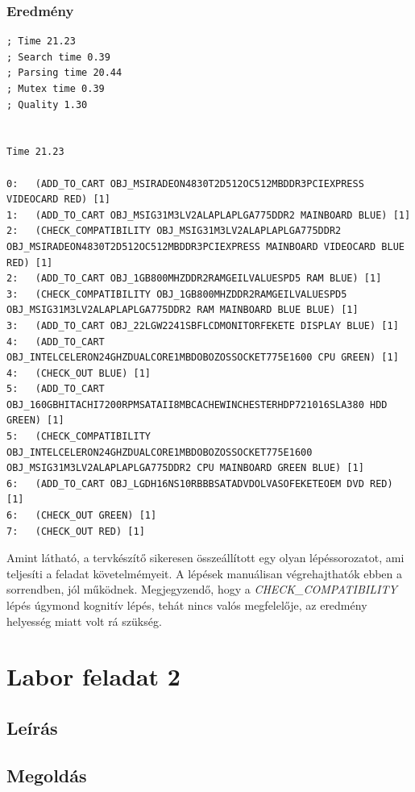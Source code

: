 \subsubsection{Eredmény}
\begin{lstlisting}[frame=single,float=!ht]	
; Time 21.23
; Search time 0.39
; Parsing time 20.44
; Mutex time 0.39
; Quality 1.30


Time 21.23

0:   (ADD_TO_CART OBJ_MSIRADEON4830T2D512OC512MBDDR3PCIEXPRESS VIDEOCARD RED) [1]
1:   (ADD_TO_CART OBJ_MSIG31M3LV2ALAPLAPLGA775DDR2 MAINBOARD BLUE) [1]
2:   (CHECK_COMPATIBILITY OBJ_MSIG31M3LV2ALAPLAPLGA775DDR2 OBJ_MSIRADEON4830T2D512OC512MBDDR3PCIEXPRESS MAINBOARD VIDEOCARD BLUE RED) [1]
2:   (ADD_TO_CART OBJ_1GB800MHZDDR2RAMGEILVALUESPD5 RAM BLUE) [1]
3:   (CHECK_COMPATIBILITY OBJ_1GB800MHZDDR2RAMGEILVALUESPD5 OBJ_MSIG31M3LV2ALAPLAPLGA775DDR2 RAM MAINBOARD BLUE BLUE) [1]
3:   (ADD_TO_CART OBJ_22LGW2241SBFLCDMONITORFEKETE DISPLAY BLUE) [1]
4:   (ADD_TO_CART OBJ_INTELCELERON24GHZDUALCORE1MBDOBOZOSSOCKET775E1600 CPU GREEN) [1]
4:   (CHECK_OUT BLUE) [1]
5:   (ADD_TO_CART OBJ_160GBHITACHI7200RPMSATAII8MBCACHEWINCHESTERHDP721016SLA380 HDD GREEN) [1]
5:   (CHECK_COMPATIBILITY OBJ_INTELCELERON24GHZDUALCORE1MBDOBOZOSSOCKET775E1600 OBJ_MSIG31M3LV2ALAPLAPLGA775DDR2 CPU MAINBOARD GREEN BLUE) [1]
6:   (ADD_TO_CART OBJ_LGDH16NS10RBBBSATADVDOLVASOFEKETEOEM DVD RED) [1]
6:   (CHECK_OUT GREEN) [1]
7:   (CHECK_OUT RED) [1]
\end{lstlisting}
Amint látható, a tervkészítő sikeresen összeállított egy olyan lépéssorozatot, ami teljesíti a feladat követelmémyeit. A lépések manuálisan végrehajthatók ebben a sorrendben, jól működnek. Megjegyzendő, hogy a \emph{CHECK\_COMPATIBILITY} lépés úgymond kognitív lépés, tehát nincs valós megfelelője, az eredmény helyesség miatt volt rá szükség.

\section{Labor feladat 2}
\subsection{Leírás}
\subsection{Megoldás}